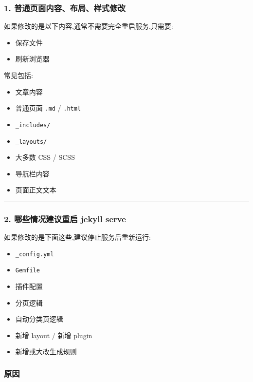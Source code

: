 \documentclass[lang=cn,scheme=chinese,color=blue,device=normal,toc=onecol,math=cm]{elegantbook}
\begin{document}
\subsubsection{1. 普通页面内容、布局、样式修改}


如果修改的是以下内容,通常不需要完全重启服务,只需要:\par


\begin{itemize}
\item 保存文件
\item 刷新浏览器
\end{itemize}


常见包括:\par


\begin{itemize}
\item 文章内容
\item 普通页面 \texttt{.md} /\allowbreak{} \texttt{.html}
\item \texttt{\_\allowbreak{}includes/\allowbreak{}}
\item \texttt{\_\allowbreak{}layouts/\allowbreak{}}
\item 大多数 CSS /\allowbreak{} SCSS
\item 导航栏内容
\item 页面正文文本
\end{itemize}


\medskip\hrule\medskip


\subsubsection{2. 哪些情况建议重启 jekyll serve}


如果修改的是下面这些,建议停止服务后重新运行:\par


\begin{itemize}
\item \texttt{\_\allowbreak{}config.yml}
\item \texttt{Gemfile}
\item 插件配置
\item 分页逻辑
\item 自动分类页逻辑
\item 新增 layout /\allowbreak{} 新增 plugin
\item 新增或大改生成规则
\end{itemize}


\subsubsection{原因}
\end{document}
